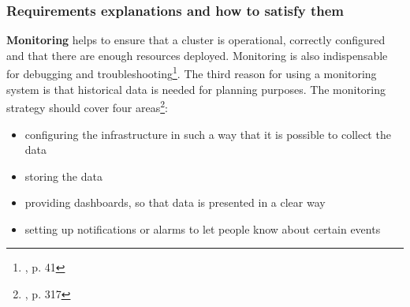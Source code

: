 \subsubsection{Requirements explanations and how to satisfy them}
\textbf{Monitoring} helps to ensure that a cluster is operational, correctly configured and that there are enough resources deployed. Monitoring is also indispensable for debugging and troubleshooting\footnote{\cite{book-mastering-k8s}, p. 41}. The third reason for using a monitoring system is that historical data is needed for planning purposes. The monitoring strategy should cover four areas\footnote{\cite{book-cicd}, p. 317}:
\begin{itemize}
\item configuring the infrastructure in such a way that it is possible to collect the data
\item storing the data
\item providing dashboards, so that data is presented in a clear way
\item setting up notifications or alarms to let people know about certain events
\end{itemize}
